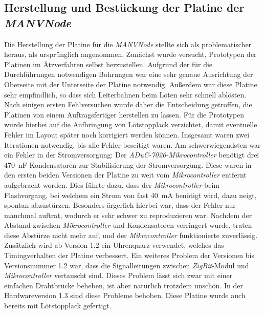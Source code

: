\subsection{Herstellung und Bestückung der Platine der \emph{MANVNode}}
Die Herstellung der Platine für die \emph{MANVNode} stellte sich als problematischer heraus, als ursprünglich 
angenommen. Zunächst wurde versucht, Prototypen der Platinen im Ätzverfahren selbst herzustellen. Aufgrund der 
für die Durchführungen notwendigen Bohrungen war eine sehr genaue Ausrichtung der Oberseite mit der Unterseite 
der Platine notwendig. Außerdem war diese Platine sehr empfindlich, so dass sich Leiterbahnen beim Löten
sehr schnell ablösten. Nach einigen ersten Fehlversuchen wurde daher die Entscheidung getroffen, die Platinen
von einem Auftragsfertiger herstellen zu lassen. Für die Prototypen wurde hierbei auf die Aufbringung von 
Lötstopplack verzichtet, damit eventuelle Fehler im Layout später noch korrigiert werden können. Insgesamt waren
zwei Iterationen notwendig, bis alle Fehler beseitigt waren. Am schwerwiegendsten war ein Fehler in der 
Stromversorgung: Der \emph{ADuC-7026-Mikrocontroller} benötigt drei 470~nF-Kondensatoren zur Stabilisierung der
Stromversorgung. Diese waren in den ersten beiden Versionen der Platine zu weit vom \emph{Mikrocontroller} entfernt 
aufgebracht worden. Dies führte dazu, dass der \emph{Mikrocontroller} beim Flashvorgang, bei welchem ein Strom von fast
40~mA benötigt wird, dazu neigt, spontan abzustürzen. Besonders ärgerlich hierbei war, dass der Fehler nur manchmal
auftrat, wodurch er sehr schwer zu reproduzieren war. Nachdem der Abstand zwischen \emph{Mikrocontroller} und Kondensatoren
verringert wurde, traten diese Abstürze nicht mehr auf, und der \emph{Mikrocontroller} funktionierte zuverlässig. Zusätzlich
wird ab Version 1.2 ein Uhrenquarz verwendet, welches das Timingverhalten der Platine verbessert. Ein weiteres
Problem der Versionen bis Versionsnummer 1.2 war, dass die Signalleitungen zwischen \emph{ZigBit}-Modul und
\emph{Mikrocontroller} vertauscht sind. Dieses Problem lässt sich zwar mit einer einfachen Drahtbrücke beheben, ist aber
natürlich trotzdem unschön. In der Hardwareversion 1.3 sind diese Probleme behoben. Diese Platine wurde auch bereits
mit Lötstopplack gefertigt.  

